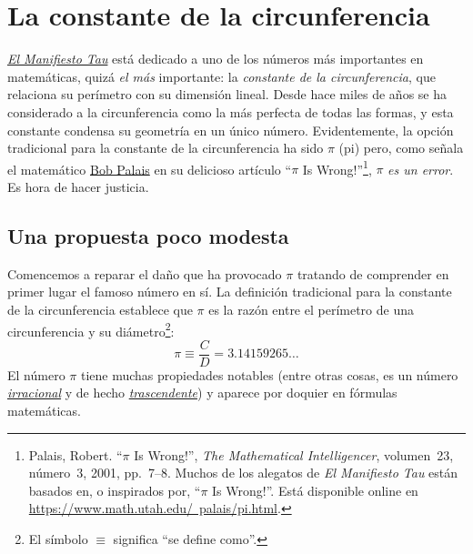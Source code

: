 
\section{La constante de la circunferencia} %
\label{sec:the_circle_constant}

\href{http://tauday.com/el-manifiesto-tau}{\emph{El Manifiesto Tau}} está dedicado a uno de los números más importantes en matemáticas, quizá \emph{el más} importante: la \emph{constante de la circunferencia}, que relaciona su perímetro con su dimensión lineal. Desde hace miles de años se ha considerado a la circunferencia como la más perfecta de todas las formas, y esta constante condensa su geometría en un único número. Evidentemente, la opción tradicional para la constante de la circunferencia ha sido $\pi$ (pi) pero, como señala el matemático \href{http://www.math.utah.edu/~palais}{Bob Palais} en su delicioso artículo ``$\pi$ Is Wrong!''\footnote{Palais, Robert. ``$\pi$ Is Wrong!'', \emph{The Mathematical Intelligencer}, volumen~23, número~3, 2001, pp.~7--8. Muchos de los alegatos de \emph{El Manifiesto Tau} están basados en, o inspirados por, ``$\pi$ Is Wrong!''. Está disponible online en \href{https://www.math.utah.edu/~palais/pi.html}{https://www.math.utah.edu/~palais/pi.html}.}, $\pi$ \emph{es un error}. Es hora de hacer justicia.

  \subsection{Una propuesta poco modesta} %
  \label{sec:an_immodest_proposal}

Comencemos a reparar el daño que ha provocado $\pi$ tratando de comprender en primer lugar el famoso número en sí. La definición tradicional para la constante de la circunferencia establece que $\pi$ es la razón entre el perímetro de una circunferencia y su diámetro\footnote{El símbolo $\equiv$ significa ``se define como''.}:
\begin{equation}
\label{eq:pi}
\pi \equiv \frac{C}{D} = 3.14159265\ldots
\end{equation}
El número $\pi$ tiene muchas propiedades notables (entre otras cosas, es un número \href{https://es.wikipedia.org/wiki/Número_irracional}{\emph{irracional}} y de hecho \href{https://es.wikipedia.org/wiki/Número_trascendente}{\emph{trascendente}}) y aparece por doquier en fórmulas matemáticas.

